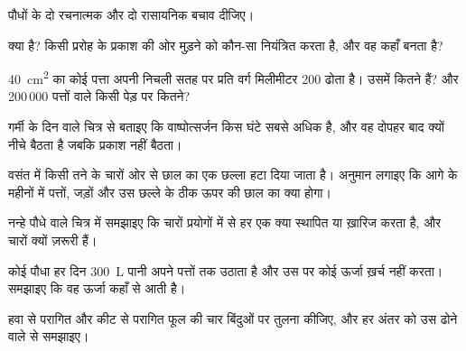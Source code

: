 \begin{exercise}[$\star$]\label{exo:g12:plant-rooted-life:4}
पौधों के दो रचनात्मक और दो रासायनिक बचाव दीजिए।
\end{exercise}

\begin{exercise}[$\star$]\label{exo:g12:plant-rooted-life:5}
 क्या है? किसी प्ररोह के प्रकाश की ओर मुड़ने को कौन-सा 
नियंत्रित करता है, और वह कहाँ बनता है?
\end{exercise}

\begin{exercise}[$\star\star$]\label{exo:g12:plant-rooted-life:6}
\qty{40}{cm^2} का कोई पत्ता अपनी निचली सतह पर प्रति वर्ग मिलीमीटर 200 
ढोता है। उसमें कितने  हैं? और 200\,000 पत्तों वाले किसी पेड़ पर कितने?
\end{exercise}

\begin{exercise}[$\star\star$]\label{exo:g12:plant-rooted-life:7}
गर्मी के दिन वाले चित्र से बताइए कि वाष्पोत्सर्जन किस घंटे सबसे अधिक है, और
वह दोपहर बाद क्यों नीचे बैठता है जबकि प्रकाश नहीं बैठता।
\end{exercise}

\begin{exercise}[$\star\star$]\label{exo:g12:plant-rooted-life:8}
वसंत में किसी तने के चारों ओर से छाल का एक छल्ला हटा दिया जाता है। अनुमान
लगाइए कि आगे के महीनों में पत्तों, जड़ों और उस छल्ले के ठीक ऊपर की छाल का
क्या होगा।
\end{exercise}

\begin{exercise}[$\star\star$]\label{exo:g12:plant-rooted-life:9}
नन्हे पौधे वाले चित्र में समझाइए कि चारों प्रयोगों में से हर एक क्या
स्थापित या ख़ारिज करता है, और चारों क्यों ज़रूरी हैं।
\end{exercise}

\begin{exercise}[$\star\star$]\label{exo:g12:plant-rooted-life:10}
कोई पौधा हर दिन \qty{300}{L} पानी अपने पत्तों तक उठाता है और उस पर कोई
ऊर्जा ख़र्च नहीं करता। समझाइए कि वह ऊर्जा कहाँ से आती है।
\end{exercise}

\begin{exercise}[$\star\star$]\label{exo:g12:plant-rooted-life:11}
हवा से परागित और कीट से परागित फूल की चार बिंदुओं पर तुलना कीजिए, और हर
अंतर को उस ढोने वाले से समझाइए।
\end{exercise}

